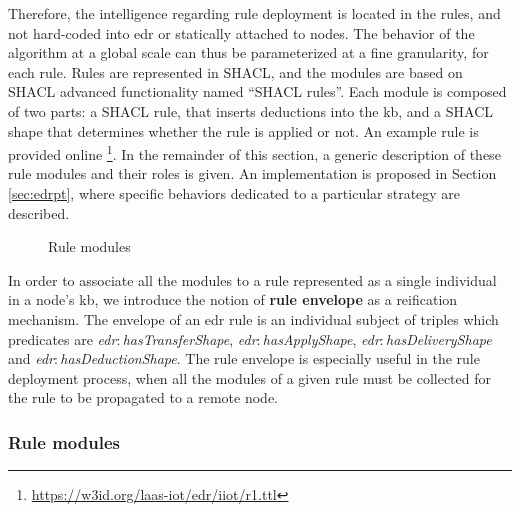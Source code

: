 \documentclass{iosart2c}
\newcommand{\namespace}[1]{\textit{#1$:$}}
\newcommand{\concept}[2]{\namespace{#1}\-\textit{#2}}
\begin{document}
Therefore, the intelligence regarding rule deployment is located in the rules, and not hard-coded into \gls{edr} or statically attached to nodes. 
The behavior of the algorithm at a global scale can thus be parameterized at a fine granularity, for each rule.
Rules are represented in SHACL, and the modules are based on SHACL advanced functionality named ``SHACL rules''.
Each module is composed of two parts: a SHACL rule, that inserts deductions into the \gls{kb}, and a SHACL shape that determines whether the rule is applied or not. 
An example rule is provided online \footnote{\url{https://w3id.org/laas-iot/edr/iiot/r1.ttl}}.
In the remainder of this section, a generic description of these rule modules and their roles is given. 
An implementation is proposed in Section \textsection \ref{sec:edrpt}, where specific behaviors dedicated to a particular strategy are described.

\begin{figure}
	\centering
	\caption{Rule modules}
	\label{fig:rule_modules}
	\scalebox{0.68}{
		
	}
\end{figure}

In order to associate all the modules to a rule represented as a single individual in a node's \gls{kb}, we introduce the notion of \textbf{rule envelope} as a reification mechanism. 
The envelope of an \gls{edr} rule is an individual subject of triples which predicates are \concept{edr}{has\-Transfer\-Shape}, \concept{edr}{has\-Apply\-Shape}, \concept{edr}{has\-Delivery\-Shape} and \concept{edr}{has\-Deduction\-Shape}.
The rule envelope is especially useful in the rule deployment process, when all the modules of a given rule must be collected for the rule to be propagated to a remote node.

\subsubsection{Rule modules}
\label{subsubs:modules}
\end{document}
